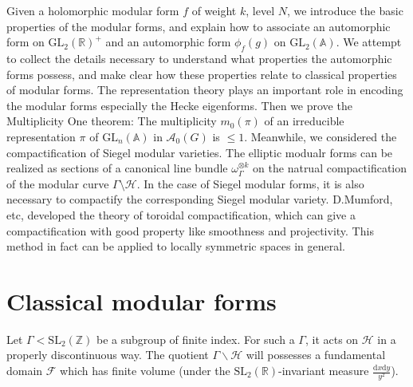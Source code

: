 \documentclass[11pt,english]{smfart}
\theoremstyle{definition}
\theoremstyle{remark}
\newcommand{\under}{\!\setminus\!}
\begin{document}
Given a holomorphic modular form $f$ of weight $k$, level $N$, we introduce the basic properties of the modular forms, and explain how to associate an automorphic form on $\mathrm{GL}_2(\mathbb{R})^{+}$ and an automorphic form $\phi_f(g)$ on $\mathrm{GL}_2(\mathbb{A})$. We attempt to collect the details necessary to understand what properties the automorphic forms possess, and make clear how these properties relate to classical properties of modular forms. The representation theory plays an important role in encoding the modular forms especially the Hecke eigenforms. Then we prove the Multiplicity One theorem: The multiplicity $m_0(\pi)$ of an irreducible representation $\pi$ of $\mathrm{GL}_n(\mathbb{A})$ in $\mathcal{A}_0(G)$ is $\leq 1$. Meanwhile, we considered the compactification of Siegel modular varieties. The elliptic modualr forms can be realized as sections of a canonical line bundle $\omega_\Gamma^{\otimes k}$ on the natrual compactification of the modular curve $\Gamma\under\mathcal{H}$. In the case of Siegel modular forms, it is also necessary to compactify the corresponding Siegel modular variety. D.Mumford, etc, developed the theory of toroidal compactification, which can give a compactification with good property like smoothness and projectivity. This method in fact can be applied to locally symmetric spaces in general. 

\section{Classical modular forms}
Let $\Gamma < \mathrm{SL_2}(\mathbb{Z})$ be a subgroup of finite index.
For such a $\Gamma$, it acts on $\mathcal{H}$ in a properly discontinuous way.
The quotient $\Gamma\backslash \mathcal{H}$ will possesses a fundamental domain $\mathcal{F}$ which has finite volume (under the $\mathrm{SL_2}(\mathbb{R})$-invariant measure $\frac{\mathrm{d}x\mathrm{d}y}{y^2}$).
\end{document}
